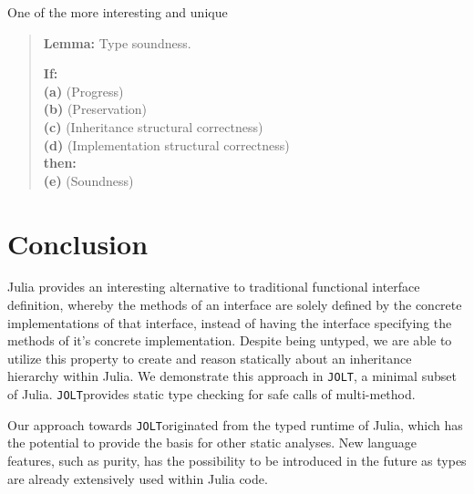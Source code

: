 \documentclass[preprint]{sigplanconf}
\newcommand{\xt}[1]{\texttt{#1}}
\newcommand{\jolt}{\xt{JOLT}}
\begin{document}
One of the more interesting and unique 

\begin{quote}{\bf Lemma: } Type soundness.

 {\bf If:} \\
   {\bf (a)} (Progress) \\
   {\bf (b)} (Preservation) \\  
   {\bf (c)} (Inheritance structural correctness) \\
   {\bf (d)} (Implementation structural correctness) \\
 
 {\bf then:}\\
   {\bf (e)} (Soundness)
\end{quote}

\section{Conclusion}

Julia provides an interesting alternative to traditional functional interface 
definition, whereby the methods of an interface are solely defined by 
the concrete implementations of that interface, instead of having the interface specifying
the methods of it's concrete implementation. Despite being
untyped, we are able to utilize this property to create and reason statically about an inheritance
hierarchy within Julia. We demonstrate this approach in \jolt, a minimal subset
of Julia. \jolt provides static type checking for safe calls of multi-method.

Our approach towards \jolt originated from the typed runtime of Julia, which has the potential to
provide the basis for other static analyses. New language features, such as purity, has the possibility
to be introduced in the future as types are already extensively used within Julia code.



\end{document}

